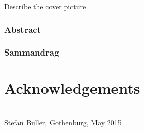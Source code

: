 \vfill
{} Describe the cover picture 
\clearpage
\subsection*{\centering Abstract}
{\fontsize{10}{11}\selectfont 
}

\addto\captionsswedish{%
  \renewcommand{\abstractname}%
    {Sammandrag}%
}
\subsection*{\centering Sammandrag}
{\fontsize{10}{11}\selectfont 
}
\vfill
\thispagestyle{empty}

\chapter*{Acknowledgements}
%

\\[1cm]

\hfill Stefan Buller, Gothenburg, May 2015
\clearpage
{}

